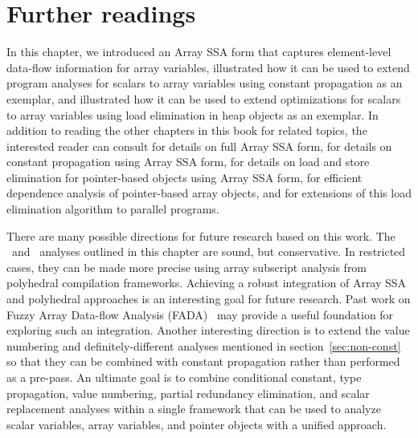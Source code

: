 \section{Further readings}
\label{sec:conclusions}
In this chapter,
we introduced an Array SSA form 
that captures element-level data-flow information for array variables,
illustrated how it can be used to extend program analyses for
scalars to array variables using constant propagation 
as an exemplar, and illustrated how it can be used to extend
optimizations for scalars to array variables using load elimination in
heap objects as
an exemplar.
In addition to reading the other chapters in this book for related
topics, the interested reader can consult \cite{KnSa98} for 
details on full Array SSA form, \cite{KnSa98b} for details on constant
propagation using Array SSA form, \cite{FiKS00} for
details on load and store elimination for pointer-based objects using
Array SSA form, \cite{SaFi01} for efficient dependence analysis of
pointer-based array objects, and \cite{BaSa09} for extensions of this load
elimination algorithm to parallel programs.


There are many possible directions for future research based on this
work.
The \ds\ and \dd\ analyses outlined in this chapter are sound, but
conservative.  In restricted cases, they can be made more precise using array subscript
analysis from polyhedral compilation frameworks.  Achieving a robust
integration of Array SSA and polyhedral approaches is an interesting goal for future
research.  Past work on Fuzzy Array Data-flow Analysis
(FADA)~\cite{BCF97} may provide a useful foundation for exploring such
an integration.
Another interesting direction is to extend the value numbering and 
definitely-different analyses mentioned in section~\ref{sec:non-const}
so that they can be combined with constant propagation
rather than performed as a pre-pass.
An ultimate goal is
to combine conditional constant, type propagation, value numbering, partial redundancy elimination,
and scalar replacement analyses within a single framework that can be
used to analyze scalar variables, array variables, and pointer objects
with a unified approach.


